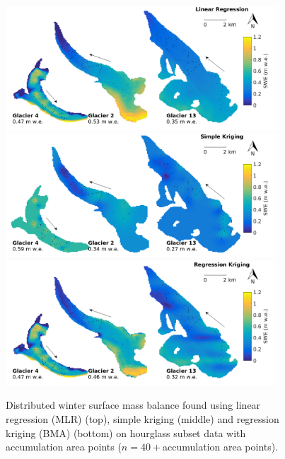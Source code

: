 \documentclass[12pt]{article}
\begin{document}
\begin{figure}[H]
	\centering
	\includegraphics[width =0.9\textwidth]{MapSubset_LRAhourglass_n40S4.png}\\
	\includegraphics[width =0.9\textwidth]{MapSubset_SKAhourglass_n40S4.png}\\
	\includegraphics[width =0.9\textwidth]{MapSubset_RKAhourglass_n40S4.png}\\
	\caption{Distributed winter surface mass balance found using linear regression (MLR) (top), simple kriging (middle) and regression kriging (BMA) (bottom) on hourglass subset data with accumulation area points ($n=40+$accumulation area points). }
	\label{fig:MapSubset_Ahourglass_n40S4}
\end{figure}
\end{document}
